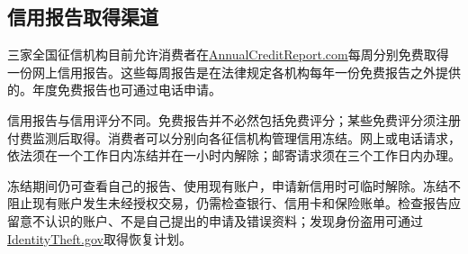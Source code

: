 \documentclass[UTF8,fontset=none,11pt,a4paper]{ctexart}
\begin{document}
\subsection*{信用报告取得渠道}
三家全国征信机构目前允许消费者在\url{AnnualCreditReport.com}每周分别免费取得一份网上信用报告。这些每周报告是在法律规定各机构每年一份免费报告之外提供的。年度免费报告也可通过\allowbreak\mbox{电话申请。}


信用报告与信用评分不同。免费报告并不必然包括免费评分；某些免费评分须注册付费监测后取得。消费者可以分别向各征信机构管理信用冻结。网上或电话请求，依法须在一个工作日内冻结并在一小时内解除；邮寄请求须在三个工作\allowbreak\mbox{日内办理。}


冻结期间仍可查看自己的报告、使用现有账户，申请新信用时可临时解除。冻结不阻止现有账户发生未经授权交易，仍需检查银行、信用卡和保险账单。检查报告应留意不认识的账户、不是自己提出的申请及错误资料；发现身份盗用可通过\url{IdentityTheft.gov}取得\allowbreak\mbox{恢复计划。}
\end{document}

